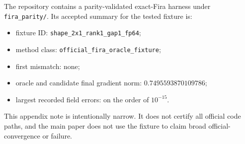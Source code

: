 The repository contains a parity-validated exact-Fira harness under
\texttt{fira\_parity/}. Its accepted summary for the tested fixture is:
\begin{itemize}
\item fixture ID:
\texttt{shape\_2x1\_rank1\_gap1\_fp64};
\item method class:
\texttt{official\_fira\_oracle\_fixture};
\item first mismatch: none;
\item oracle and candidate final gradient norm:
$0.7495593870109786$;
\item largest recorded field errors: on the order of $10^{-15}$.
\end{itemize}

This appendix note is intentionally narrow. It does not certify all official
\Fira code paths, and the main paper does not use the fixture to claim broad
official-\Fira convergence or failure.
